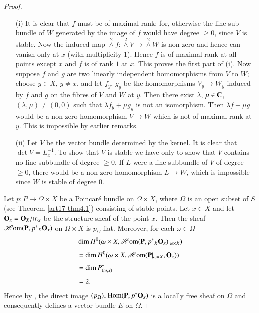 \begin{proof}
\begin{itemize}
\item[(i)] It is clear that $f$ must be of maximal rank; for, otherwise the line sub-bundle of $W$ generated by the image of $f$ would have degree $\geq 0$, since $V$ is stable. Now the induced map ${\displaystyle{\mathop{\wedge}\limits^{2}}} f: {\displaystyle{\mathop{\wedge}\limits^{2}}} V\to {\displaystyle{\mathop{\wedge}\limits^{2}}} W$ is non-zero and hence can vanish only at $x$ (with multiplicity 1). Hence $f$ is of maximal rank at all points except $x$ and $f$ is of rank $1$ at $x$. This proves the first part of (i). Now suppose $f$ and $g$ are two linearly independent homomorphisms from $V$ to $W$; choose $y\in X$, $y\neq x$, and let $f_{y}$, $g_{y}$ be the homomorphisms $V_{y}\to W_{y}$ induced by $f$ and $g$ on the fibres of $V$ and $W$ at $y$. Then there exist $\lambda$, $\mu\in \mathbf{C}$, $(\lambda,\mu)\neq (0,0)$ such that $\lambda f_{y}+\mu g_{y}$ is not an isomorphism. Then $\lambda f+\mu g$ would be a non-zero homomorphism $V\to W$ which is not of maximal rank at $y$. This is impossible by earlier remarks.

\item[(ii)] Let $V$ be the vector bundle determined by the kernel. It is clear that $\det V=L^{-1}_{x}$. To show that $V$ is stable we have only to show that $V$ contains no line subbundle of degree $\geq 0$. If $L$ were a line subbundle of $V$ of degree $\geq 0$, there would be a non-zero homomorphism $L\to W$, which is impossible since $W$ is stable of degree $0$.
\end{itemize}

Let $p:P\to \Omega\times X$ be a Poincar\'e bundle on $\Omega\times X$, where $\Omega$ is an open subset of $S$ (see Theorem \ref{art17-thm4.1}) consisting of stable points. Let $x\in X$ and let $\mathbf{O}_{x}=\mathbf{O}_{X}/\mathfrak{m}_{x}$ be the structure sheaf of the point $x$. Then the sheaf $\operatorname{\mathscr{H}\mathrm{om}} (\mathbf{P},p^{*}{}_{X}\mathbf{O}_{x})$ on $\Omega\times X$ is $p_{\Omega}$ flat. Moreover, for each $\omega\in \Omega$
\begin{align*}
& \dim H^{0}(\omega\times X,\operatorname{\mathscr{H}\mathrm{om}} (\mathbf{P},p^{*}{}_{X}\mathbf{O}_{x})|_{\omega\times X})\\[3pt]
&= \dim H^{0}(\omega\times X,\operatorname{\mathscr{H}\mathrm{om}} (\mathbf{P}|_{\omega\times X},\mathbf{O}_{x}))\\[3pt]
&= \dim P^{*}_{(\omega,x)}\\[3pt]
&= 2.
\end{align*}\pageoriginale
Hence by \cite{art17-key1}, the direct image $(p_{\Omega})_{*}\operatorname{\mathrm{Hom}} (\mathbf{P},p^{*}\mathbf{O}_{x})$ is a locally free sheaf on $\Omega$ and consequently defines a vector bundle $E$ on $\Omega$.
\end{proof}

